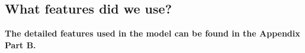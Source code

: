 \documentclass[english]{article}
\begin{document}
\begin{enumerate}
    \subsection{What features did we use?}
    \bf{The detailed features used in the model can be found in the Appendix Part B.}

    
\end{enumerate}
\end{document}
